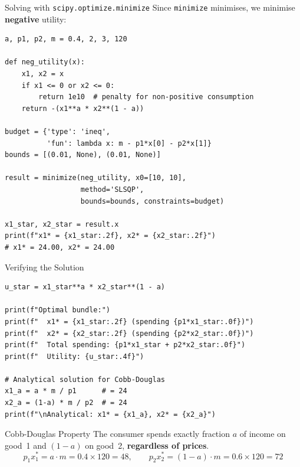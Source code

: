 \documentclass[aspectratio=169, 10pt]{beamer}
\begin{document}
\begin{frame}[fragile]{Solving with \texttt{scipy.optimize.minimize}}
Since \texttt{minimize} minimises, we minimise \textbf{negative} utility:
\begin{lstlisting}
a, p1, p2, m = 0.4, 2, 3, 120

def neg_utility(x):
    x1, x2 = x
    if x1 <= 0 or x2 <= 0:
        return 1e10  # penalty for non-positive consumption
    return -(x1**a * x2**(1 - a))

budget = {'type': 'ineq',
          'fun': lambda x: m - p1*x[0] - p2*x[1]}
bounds = [(0.01, None), (0.01, None)]

result = minimize(neg_utility, x0=[10, 10],
                  method='SLSQP',
                  bounds=bounds, constraints=budget)

x1_star, x2_star = result.x
print(f"x1* = {x1_star:.2f}, x2* = {x2_star:.2f}")
# x1* = 24.00, x2* = 24.00
\end{lstlisting}
\end{frame}

\begin{frame}[fragile]{Verifying the Solution}
\begin{lstlisting}
u_star = x1_star**a * x2_star**(1 - a)

print(f"Optimal bundle:")
print(f"  x1* = {x1_star:.2f} (spending {p1*x1_star:.0f})")
print(f"  x2* = {x2_star:.2f} (spending {p2*x2_star:.0f})")
print(f"  Total spending: {p1*x1_star + p2*x2_star:.0f}")
print(f"  Utility: {u_star:.4f}")

# Analytical solution for Cobb-Douglas
x1_a = a * m / p1      # = 24
x2_a = (1-a) * m / p2  # = 24
print(f"\nAnalytical: x1* = {x1_a}, x2* = {x2_a}")
\end{lstlisting}
\vspace{0.5em}
\begin{block}{Cobb-Douglas Property}
The consumer spends exactly fraction $a$ of income on good~1
and $(1-a)$ on good~2, \textbf{regardless of prices}.
\[
  p_1 x_1^* = a \cdot m = 0.4 \times 120 = 48, \qquad
  p_2 x_2^* = (1-a) \cdot m = 0.6 \times 120 = 72
\]
\end{block}
\end{frame}
\end{document}
